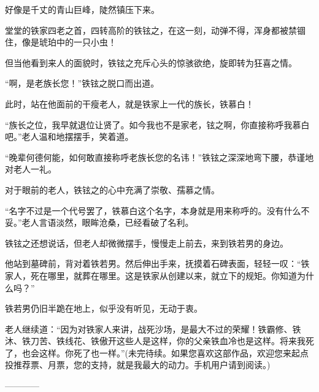 \begin{this_body}
好像是千丈的青山巨峰，陡然镇压下来。

堂堂的铁家四老之首，四转高阶的铁铉之，在这一刻，动弹不得，浑身都被禁锢住，像是琥珀中的一只小虫！

但当他看到来人的面貌时，铁铉之充斥心头的惊骇欲绝，旋即转为狂喜之情。

“啊，是老族长您！”铁铉之脱口而出道。

此时，站在他面前的干瘦老人，就是铁家上一代的族长，铁慕白！

“族长之位，我早就退位让贤了。如今我也不是家老，铉之啊，你直接称呼我慕白吧。”老人温和地摆摆手，笑着道。

“晚辈何德何能，如何敢直接称呼老族长您的名讳！”铁铉之深深地弯下腰，恭谨地对老人一礼。

对于眼前的老人，铁铉之的心中充满了崇敬、孺慕之情。

“名字不过是一个代号罢了，铁慕白这个名字，本身就是用来称呼的。没有什么不妥。”老人言语淡然，眼眸沧桑，已经看破了名利。

铁铉之还想说话，但老人却微微摆手，慢慢走上前去，来到铁若男的身边。

他站到墓碑前，背对着铁若男。然后伸出手来，抚摸着石碑表面，轻轻一叹：“铁家人，死在哪里，就葬在哪里。这是铁家从创建以来，就立下的规矩。你知道为什么吗？”

铁若男仍旧半跪在地上，似乎没有听见，无动于衷。

老人继续道：“因为对铁家人来讲，战死沙场，是最大不过的荣耀！铁霸修、铁沐、铁刀苦、铁线花、铁傲开这些人是这样，你的父亲铁血冷也是这样。将来我死了，也会这样。你死了也一样。”(未完待续。如果您喜欢这部作品，欢迎您来起点投推荐票、月票，您的支持，就是我最大的动力。手机用户请到阅读。)

------------

\end{this_body}

